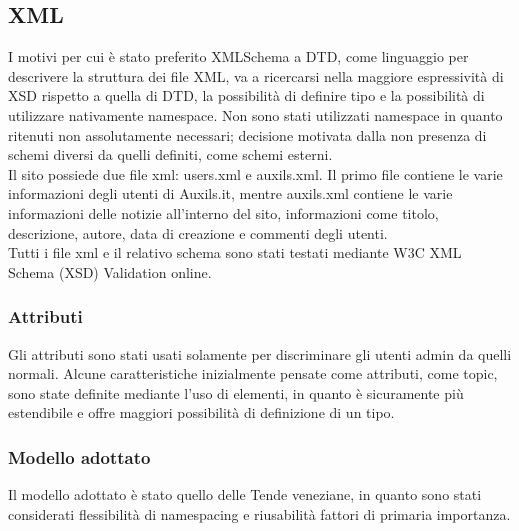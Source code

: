 \subsection{XML}
I motivi per cui è stato preferito XMLSchema a DTD, come linguaggio per descrivere la struttura dei file XML, va a ricercarsi nella maggiore espressività di XSD rispetto a quella di DTD, la possibilità di definire tipo e la possibilità di utilizzare nativamente namespace. Non sono stati utilizzati namespace in quanto ritenuti non assolutamente necessari; decisione motivata dalla non presenza di schemi diversi da quelli definiti, come schemi esterni.\\
Il sito possiede due file xml: users.xml e auxils.xml.
Il primo file contiene le varie informazioni degli utenti di Auxils.it, mentre auxils.xml contiene le varie informazioni delle notizie all'interno del sito, informazioni come titolo, descrizione, autore, data di creazione e commenti degli utenti.\\
Tutti i file xml e il relativo schema sono stati testati mediante W3C XML Schema (XSD) Validation online.

\subsubsection{Attributi}

Gli attributi sono stati usati solamente per discriminare gli utenti admin da quelli normali.
Alcune caratteristiche inizialmente pensate come attributi, come topic, sono state definite mediante l'uso di elementi, in quanto è sicuramente più estendibile e offre maggiori possibilità di definizione di un tipo.

\subsubsection{Modello adottato}
Il modello adottato è stato quello delle Tende veneziane, in quanto sono stati considerati flessibilità di namespacing e riusabilità fattori di primaria importanza.\\
